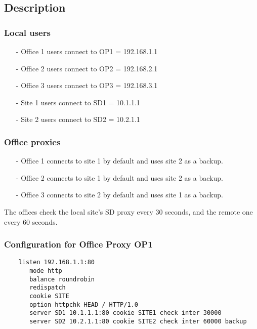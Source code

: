 \subsection{Description}

\subsubsection{Local users}

\begin{itemize}
\item[-] Office 1 users connect to OP1 = 192.168.1.1
\item[-] Office 2 users connect to OP2 = 192.168.2.1
\item[-] Office 3 users connect to OP3 = 192.168.3.1
\item[-] Site 1 users connect to SD1 = 10.1.1.1
\item[-] Site 2 users connect to SD2 = 10.2.1.1
\end{itemize}

\subsubsection{Office proxies}

\begin{itemize}
\item[-] Office 1 connects to site 1 by default and uses site 2 as a backup.
\item[-] Office 2 connects to site 1 by default and uses site 2 as a backup.
\item[-] Office 3 connects to site 2 by default and uses site 1 as a backup.
\end{itemize}

The offices check the local site's SD proxy every 30 seconds, and the
remote one every 60 seconds.

\subsubsection{Configuration for Office Proxy OP1}

\begin{verbatim}
    listen 192.168.1.1:80
       mode http
       balance roundrobin
       redispatch
       cookie SITE
       option httpchk HEAD / HTTP/1.0
       server SD1 10.1.1.1:80 cookie SITE1 check inter 30000
       server SD2 10.2.1.1:80 cookie SITE2 check inter 60000 backup
\end{verbatim}

